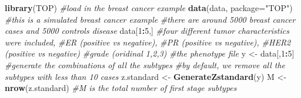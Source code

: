 \documentclass[11pt,]{article}
\newenvironment{Shaded}{\begin{snugshade}}{\end{snugshade}}
\newcommand{\CommentTok}[1]{\textcolor[rgb]{0.56,0.35,0.01}{\textit{#1}}}
\newcommand{\DataTypeTok}[1]{\textcolor[rgb]{0.13,0.29,0.53}{#1}}
\newcommand{\DecValTok}[1]{\textcolor[rgb]{0.00,0.00,0.81}{#1}}
\newcommand{\KeywordTok}[1]{\textcolor[rgb]{0.13,0.29,0.53}{\textbf{#1}}}
\newcommand{\NormalTok}[1]{#1}
\newcommand{\OperatorTok}[1]{\textcolor[rgb]{0.81,0.36,0.00}{\textbf{#1}}}
\newcommand{\StringTok}[1]{\textcolor[rgb]{0.31,0.60,0.02}{#1}}
\begin{document}
\begin{Shaded}
\begin{Highlighting}[]
\KeywordTok{library}\NormalTok{(TOP)}
\CommentTok{#load in the breast cancer example}
\KeywordTok{data}\NormalTok{(data, }\DataTypeTok{package=}\StringTok{"TOP"}\NormalTok{)}
\CommentTok{#this is a simulated breast cancer example}
\CommentTok{#there are around 5000 breast cancer cases and 5000 controls disease}
\NormalTok{data[}\DecValTok{1}\OperatorTok{:}\DecValTok{5}\NormalTok{,]}
\CommentTok{#four different tumor characteristics were included, }
\CommentTok{#ER (positive vs negative), }
\CommentTok{#PR (positive vs negative),}
\CommentTok{#HER2 (positive vs negative)}
\CommentTok{#grade (oridinal 1,2,3)}
\CommentTok{#the phenotype file}
\NormalTok{y <-}\StringTok{ }\NormalTok{data[,}\DecValTok{1}\OperatorTok{:}\DecValTok{5}\NormalTok{]}
\CommentTok{#generate the combinations of all the subtypes}
\CommentTok{#by default, we remove all the subtypes with less than 10 cases}
\NormalTok{z.standard <-}\StringTok{ }\KeywordTok{GenerateZstandard}\NormalTok{(y)}
\NormalTok{M <-}\StringTok{ }\KeywordTok{nrow}\NormalTok{(z.standard) }\CommentTok{#M is the total number of first stage subtypes}


\end{Highlighting}
\end{Shaded}
\end{document}

